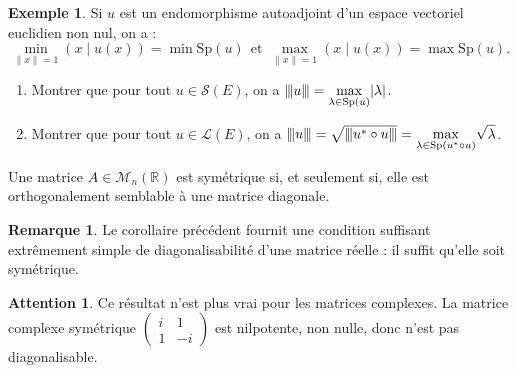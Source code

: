 \documentclass[french]{article}
\newcommand{\R}{\mathbb{R}}
\newcommand{\st}{^*}
\newcommand{\vertiii}[1]{{\left\vert\kern-0.25ex\left\vert\kern-0.25ex\left\vert #1 \right\vert\kern-0.25ex\right\vert\kern-0.25ex\right\vert}}
\theoremstyle{plain}
\theoremstyle{definition}
\newtheorem*{ex}{Exemple}
\newtheorem*{rmq}{Remarque}
\newtheorem*{attention}{Attention}
\theoremstyle{remark}
\begin{document}
\begin{ex}
	Si $u$ est un endomorphisme autoadjoint d'un espace vectoriel euclidien non nul, on a : $$\underset{\lVert x\rVert=1}{\min}(x\mid u(x))=\min\text{Sp}(u)\ \ \text{et}\ \ \underset{\lVert x\rVert=1}{\max}(x\mid u(x))=\max\text{Sp}(u).$$
\end{ex}

\begin{exo}
	\begin{enumerate}
		\item Montrer que pour tout $u\in\mathcal{S}(E)$, on a $\vertiii{u}=\displaystyle\underset{\lambda\in\text{Sp}(u)}{\max}\lvert\lambda\rvert$.
		\item Montrer que pour tout $u\in\mathcal{L}(E)$, on a $\vertiii{u}=\sqrt{\vertiii{u\st\circ u}}=\displaystyle\underset{\lambda\in\text{Sp}(u\st\circ u)}{\max}\sqrt{\lambda}$.
	\end{enumerate}
\end{exo}

\begin{cor}
	Une matrice $A\in\mathcal{M}_n(\R)$ est symétrique si, et seulement si, elle est orthogonalement semblable à une matrice diagonale.
\end{cor}

\begin{rmq}
	Le corollaire précédent fournit une condition suffisant extrêmement simple de diagonalisabilité d'une matrice réelle : il suffit qu'elle soit symétrique.
\end{rmq}

\begin{attention}
	Ce résultat n'est plus vrai pour les matrices complexes. La matrice complexe symétrique $\displaystyle\begin{pmatrix}
	i&1\\
	1&-i
\end{pmatrix}$ est nilpotente, non nulle, donc n'est pas diagonalisable.
\end{attention}
\end{document}
